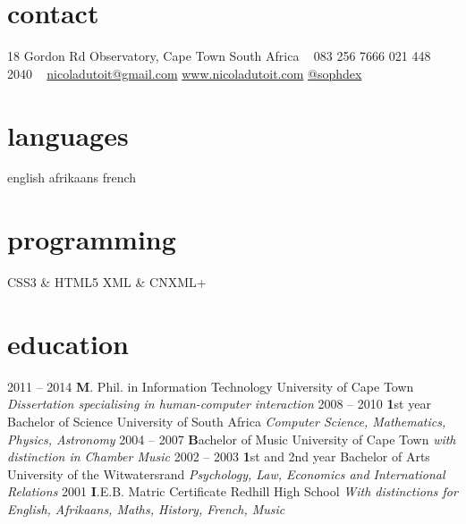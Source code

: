 \documentclass[]{friggeri-cv} %
\begin{document}


\begin{aside} %
\section{contact}
18 Gordon Rd
Observatory, Cape Town
South Africa
~
083 256 7666
021 448 2040
~
\href{mailto:nicoladutoit@gmail.com}{nicoladutoit@gmail.com}
\href{http://www.nicoladutoit.com}{www.nicoladutoit.com}
\href{https://twitter.com/sophdex}{@sophdex}
\section{languages}
english
afrikaans
french 
\section{programming}
CSS3 \& HTML5
XML \& CNXML+
\end{aside}


\section{education}

\begin{entrylist}
\entry
{2011 -- 2014}
{\textbf M. Phil. in Information Technology}
{University of Cape Town}
{\emph{Dissertation specialising in human-computer interaction}}
\entry
{2008 -- 2010}
{\textbf 1st year Bachelor of Science}
{University of South Africa}
{\emph{Computer Science, Mathematics, Physics, Astronomy}}
\entry
{2004 -- 2007}
{\textbf Bachelor of Music}
{University of Cape Town}
{\emph{with distinction in Chamber Music}}
\entry
{2002 -- 2003}
{\textbf 1st and 2nd year Bachelor of Arts}
{University of the Witwatersrand}
{\emph{Psychology, Law, Economics and International Relations}}
\entry
{2001}
{\textbf I.E.B. Matric Certificate }
{Redhill High School}
{\emph{With distinctions for English, Afrikaans, Maths, History, French, Music}}

\end{entrylist}
\end{document}

